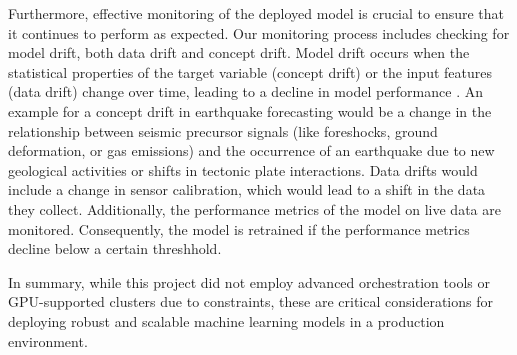 Furthermore, effective monitoring of the deployed model is crucial to ensure
that it continues to perform as expected. Our monitoring process includes
checking for model drift, both data drift and concept drift. Model drift occurs
when the statistical properties of the target variable (concept drift) or the
input features (data drift) change over time, leading to a decline in model
performance \parencite[ch. 1]{bayram2022conceptdriftmodeldegradation}.
An example for a concept drift in earthquake forecasting would
be a change in the relationship between seismic precursor signals
(like foreshocks, ground deformation, or gas emissions) and the occurrence
of an earthquake due to new geological activities or shifts in tectonic plate
interactions. Data drifts would include a change in sensor calibration, which
would lead to a shift in the data they collect. Additionally, the performance
metrics of the model on live data are monitored. Consequently, the model is
retrained if the performance metrics decline below a certain threshhold.

In summary, while this project did not employ advanced orchestration tools
or GPU-supported clusters due to constraints, these are critical considerations
for deploying robust and scalable machine learning models in a production environment.
